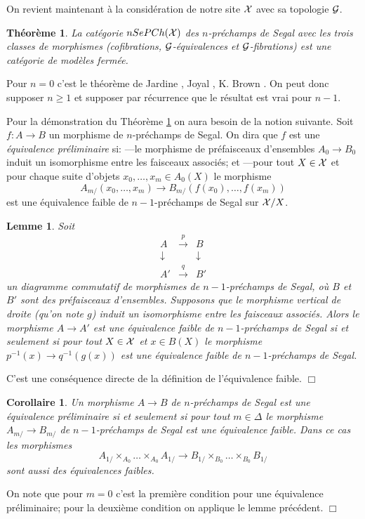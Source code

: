 \documentclass[12pt]{article}
\newcommand{\eop}{\hfill $\Box$\vspace{.1in}}
\newtheorem{lemme}[lemma]{Lemme}
\newtheorem{theoreme}[lemma]{Th\'eor\`eme}
\newtheorem{corollaire}[lemma]{Corollaire}
\newcommand{\Gg}{{\cal G}}
\newcommand{\Xx}{{\cal X}}
\begin{document}
On revient maintenant \`a la consid\'eration de notre site $\Xx$ avec sa
topologie $\Gg$.

\begin{theoreme}
\label{cmf}
La cat\'egorie $nSePCh(\Xx )$ des $n$-pr\'echamps de Segal avec les trois
classes de morphismes
(cofibrations, $\Gg$-\'equivalences et $\Gg$-fibrations) est une
cat\'egorie de mod\`eles ferm\'ee.
\end{theoreme}

Pour $n=0$ c'est le th\'eor\`eme de
Jardine \cite{Jardine}, Joyal \cite{Joyal}, K.
Brown \cite{KBrown}. On
peut donc supposer $n\geq 1$ et supposer par r\'ecurrence
que le r\'esultat est vrai pour $n-1$.

Pour la d\'emonstration du Th\'eor\`eme \ref{cmf} on aura besoin de
la notion suivante. Soit $f: A\rightarrow B$ un morphisme de
$n$-pr\'echamps de
Segal. On dira que $f$ est une {\em \'equivalence pr\'eliminaire} si:
\newline
---le morphisme de pr\'efaisceaux d'ensembles $A_0\rightarrow B_0$ induit un
isomorphisme entre les faisceaux associ\'es; et
\newline
---pour tout $X\in \Xx$ et pour chaque suite d'objets $x_0,\ldots , x_m\in
A_0(X)$
le morphisme
$$
A_{m/} (x_0,\ldots , x_m)\rightarrow B_{m/}(f(x_0),\ldots ,f(x_m))
$$
est une \'equivalence faible de $n-1$-pr\'echamps de Segal sur $\Xx /X$.

\begin{lemme}
Soit
$$
\begin{array}{ccc}
A & \stackrel{p}{\rightarrow} & B \\
\downarrow && \downarrow \\
A' & \stackrel{q}{\rightarrow} &B'
\end{array}
$$
un diagramme commutatif de morphismes de $n-1$-pr\'echamps de Segal, o\`u $B$ et
$B'$ sont des pr\'efaisceaux d'ensembles. Supposons que le morphisme vertical de
droite (qu'on note $g$) induit un isomorphisme entre les faisceaux
associ\'es. Alors
le morphisme $A\rightarrow A'$ est une
\'equivalence faible de $n-1$-pr\'echamps de Segal si et seulement si
pour tout $X\in \Xx$ et $x\in B(X)$ le morphisme
$p^{-1}(x)\rightarrow q^{-1}(g(x))$ est une \'equivalence faible de
$n-1$-pr\'echamps de Segal.
\end{lemme}
C'est une cons\'equence directe de la d\'efinition de l'\'equivalence faible.
\eop

\begin{corollaire}
\label{etape}
Un morphisme $A\rightarrow B$ de $n$-pr\'echamps de Segal est une \'equivalence
pr\'eliminaire si et seulement si pour tout $m\in \Delta$ le morphisme
$A_{m/} \rightarrow B_{m/}$ de $n-1$-pr\'echamps de Segal est une \'equivalence
faible. Dans ce cas les morphismes
$$
A_{1/} \times _{A_0}\ldots \times _{A_0} A_{1/}\rightarrow
B_{1/} \times _{B_0}\ldots \times _{B_0} B_{1/}
$$
sont aussi des \'equivalences faibles.
\end{corollaire}
On note que pour $m=0$ c'est la premi\`ere condition pour une
\'equivalence pr\'eliminaire;  pour la deuxi\`eme condition on applique le lemme
pr\'ec\'edent.
\eop
\end{document}
